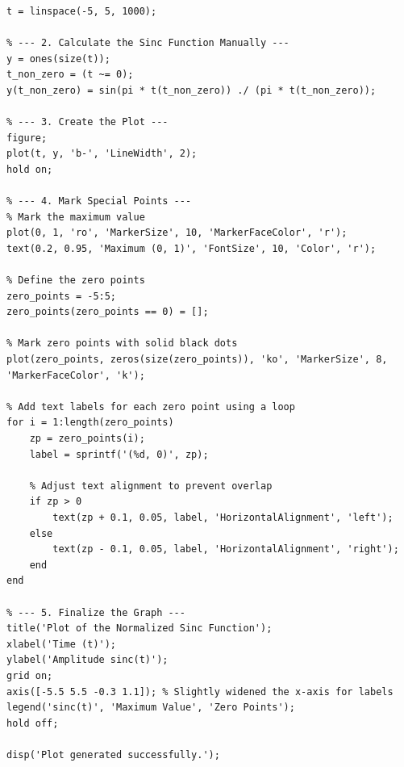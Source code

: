 \documentclass[12pt, a4paper, twoside]{ctexart}
\begin{document}
\begin{lstlisting}[style=matlabstyle, caption={MATLAB code for generating the sinc function plot.}, label={lst:sinc}]
% --- 1. Setup the Time Vector ---
t = linspace(-5, 5, 1000);

% --- 2. Calculate the Sinc Function Manually ---
y = ones(size(t)); 
t_non_zero = (t ~= 0); 
y(t_non_zero) = sin(pi * t(t_non_zero)) ./ (pi * t(t_non_zero));

% --- 3. Create the Plot ---
figure; 
plot(t, y, 'b-', 'LineWidth', 2); 
hold on; 

% --- 4. Mark Special Points ---
% Mark the maximum value
plot(0, 1, 'ro', 'MarkerSize', 10, 'MarkerFaceColor', 'r');
text(0.2, 0.95, 'Maximum (0, 1)', 'FontSize', 10, 'Color', 'r');

% Define the zero points
zero_points = -5:5; 
zero_points(zero_points == 0) = []; 

% Mark zero points with solid black dots
plot(zero_points, zeros(size(zero_points)), 'ko', 'MarkerSize', 8, 'MarkerFaceColor', 'k');

% Add text labels for each zero point using a loop
for i = 1:length(zero_points)
    zp = zero_points(i);
    label = sprintf('(%d, 0)', zp);
    
    % Adjust text alignment to prevent overlap
    if zp > 0
        text(zp + 0.1, 0.05, label, 'HorizontalAlignment', 'left');
    else
        text(zp - 0.1, 0.05, label, 'HorizontalAlignment', 'right');
    end
end

% --- 5. Finalize the Graph ---
title('Plot of the Normalized Sinc Function');
xlabel('Time (t)');
ylabel('Amplitude sinc(t)');
grid on;
axis([-5.5 5.5 -0.3 1.1]); % Slightly widened the x-axis for labels
legend('sinc(t)', 'Maximum Value', 'Zero Points');
hold off;

disp('Plot generated successfully.');
\end{lstlisting}
\end{document}
